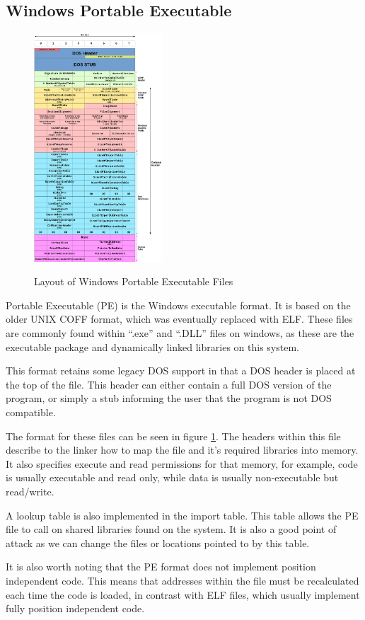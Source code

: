 		\subsection{Windows Portable Executable}
			\begin{figure}
				\includegraphics[width=0.43\textwidth]{./PE.png}
				\label{fig:PortableExecutable}
				\caption{Layout of Windows Portable Executable Files}
			\end{figure}
			Portable Executable (PE) is the Windows executable format.
			It is based on the older UNIX COFF format, which was eventually replaced with ELF.
			These files are commonly found within ``.exe'' and ``.DLL'' files on windows, as these are the executable
			package and dynamically linked libraries on this system.

			This format retains some legacy DOS support in that a DOS header is placed at the top of the file.
			This header can either contain a full DOS version of the program, or simply a stub informing the user that the program is not DOS compatible.

			The format for these files can be seen in figure \ref{fig:PortableExecutable}.
			The headers within this file describe to the linker how to map the file and it's required libraries into memory.
			It also specifies execute and read permissions for that memory, for example, code is usually executable and read only, while data is usually non-executable but read/write.

			A lookup table is also implemented in the import table.
			This table allows the PE file to call on shared libraries found on the system.
			It is also a good point of attack as we can change the files or locations pointed to by this table.

			It is also worth noting that the PE format does not implement position independent code.
			This means that addresses within the file must be recalculated each time the code is loaded,
			in contrast with ELF files, which usually implement fully position independent code.

